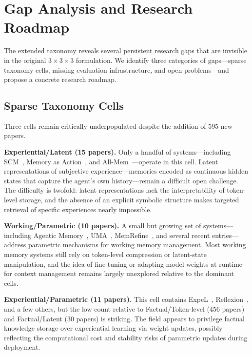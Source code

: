 \section{Gap Analysis and Research Roadmap}
\label{sec:gap-analysis}

The extended taxonomy reveals several persistent research gaps that are invisible in the original $3\times 3 \times 3$ formulation. We identify three categories of gaps---sparse taxonomy cells, missing evaluation infrastructure, and open problems---and propose a concrete research roadmap.

\subsection{Sparse Taxonomy Cells}

Three cells remain critically underpopulated despite the addition of 595 new papers.

\textbf{Experiential/Latent (15 papers).} Only a handful of systems---including SCM~\cite{Unknown2026SCM}, Memory as Action~\cite{Unknown2025MemoryasAction}, and All-Mem~\cite{Unknown2026AllMem}---operate in this cell. Latent representations of subjective experience---memories encoded as continuous hidden states that capture the agent's own history---remain a difficult open challenge. The difficulty is twofold: latent representations lack the interpretability of token-level storage, and the absence of an explicit symbolic structure makes targeted retrieval of specific experiences nearly impossible.

\textbf{Working/Parametric (10 papers).} A small but growing set of systems---including Agentic Memory~\cite{Unknown2026AgenticMemory}, UMA~\cite{Unknown2026LearningtoRemember}, MemRefine~\cite{Kim2026MemRefine}, and several recent entries---address parametric mechanisms for working memory management. Most working memory systems still rely on token-level compression or latent-state manipulation, and the idea of fine-tuning or adapting model weights at runtime for context management remains largely unexplored relative to the dominant cells.

\textbf{Experiential/Parametric (11 papers).} This cell contains ExpeL~\cite{Unknown2023ExpeL}, Reflexion~\cite{Unknown2023Reflexion}, and a few others, but the low count relative to Factual/Token-level (456 papers) and Factual/Latent (30 papers) is striking. The field appears to privilege factual knowledge storage over experiential learning via weight updates, possibly reflecting the computational cost and stability risks of parametric updates during deployment.

